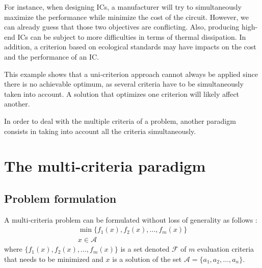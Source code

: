 For instance, when designing ICs, a manufacturer will try to simultaneously maximize the performance while minimize the cost of the circuit. However, we can already guess that those two objectives are conflicting. Also, producing high-end ICs can be subject to more difficulties in terms of thermal dissipation. In addition, a criterion based on ecological standards may have impacts on the cost and the performance of an IC.

This example shows that a uni-criterion approach cannot always be applied since there is no achievable optimum, as several criteria have to be simultaneously taken into account. A solution that optimizes one criterion will likely affect another.

In order to deal with the multiple criteria of a problem, another paradigm consists in taking into account all the criteria simultaneously. %

\section{The multi-criteria paradigm}
\label{sec:rol2.multicrit_paradigm}


\subsection{Problem formulation}
A multi-criteria problem can be formulated without loss of generality as follows \cite{BraMar2002}:
\begin{equation}
\label{multicrit_formulation}
\begin{gathered}
\min \{f_1(x), f_2(x), \dots, f_m(x)\}\\
x \in \mathcal{A}
\end{gathered}
\end{equation}
where $\{f_1(x), f_2(x), \dots, f_m(x)\}$ is a set denoted $\mathcal{F}$ of $m$ evaluation criteria that needs to be minimized and $x$ is a solution of the set $\mathcal{A} = \{a_1, a_2, \dots, a_n\}$.

